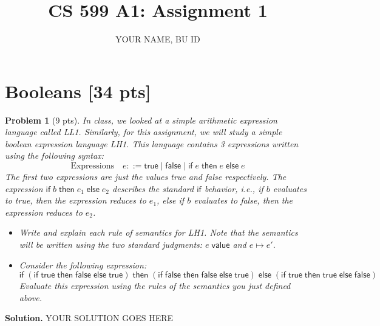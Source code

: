 \documentclass{article}
\title{CS 599 A1: Assignment 1}
\author{YOUR NAME, BU ID}
\date{}
\newcommand{\m}[1]{\mathsf{#1}}
\newcommand{\step}{\mapsto}
\newcommand{\val}[1]{#1 \; \m{value}}
\newcommand{\eif}[3]{\m{if} \; #1 \; \m{then} \; #2 \; \m{else} \; #3}
\newtheorem{problem}{Problem}
\newenvironment{solution}{\textbf{Solution.}}{}
\begin{document}
\maketitle

\section{Booleans [34 pts]}

\begin{problem}[9 pts]
    In class, we looked at a simple arithmetic expression language called LL1. Similarly, for this assignment, we will study
    a simple boolean expression language LH1. This language contains 3 expressions written using the following syntax:
    \[
        \text{Expressions} \quad e ::= \m{true} \mid \m{false} \mid \eif{e}{e}{e}
    \]
    The first two expressions are just the values true and false respectively. The expression $\eif{b}{e_1}{e_2}$
    describes the standard $\m{if}$ behavior, i.e., if $b$ evaluates to true, then the expression reduces to $e_1$,
    else if $b$ evaluates to false, then the expression reduces to $e_2$.

    \begin{itemize}
        \item[(5 pts)] Write and explain each rule of semantics for LH1. Note that the semantics will be written
        using the two standard judgments: $\val{e}$ and $e \step e'$.
        
        \item[(4 pts)] Consider the following expression:
        \[
            \eif{(\eif{\m{true}}{\m{false}}{\m{true}})}{(\eif{\m{false}}{\m{false}}{\m{true}})}{(\eif{\m{true}}{\m{true}}{\m{false}})}
        \]
        Evaluate this expression using the rules of the semantics you just defined above.
    \end{itemize}
\end{problem}

\begin{solution}
    YOUR SOLUTION GOES HERE
\end{solution}
\end{document}
